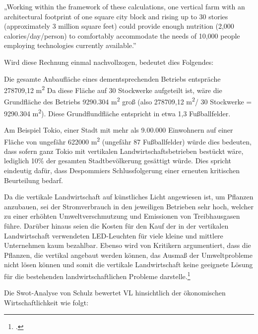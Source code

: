 \documentclass{scrartcl}
\begin{document}
\begin{displayquote}
„Working within the framework of these calculations, one vertical farm with an architectural footprint of one square city block and rising up to 30 stories (approximately 3 million square feet) could provide enough nutrition (2,000 calories/day/person) to comfortably accommodate the needs of 10,000 people employing technologies currently available.” 
\end{displayquote}

Wird diese Rechnung einmal
nachvollzogen, bedeutet dies Folgendes:

Die gesamte Anbaufläche eines dementsprechenden Betriebs entspräche\\278709,12 m\textsuperscript{2}
Da diese Fläche auf 30 Stockwerke aufgeteilt ist, wäre die Grundfläche des Betriebs 9290.304 m\textsuperscript{2} groß (also
278709,12 m\textsuperscript{2}/ 30 Stockwerke = 9290.304 m\textsuperscript{2}). Diese Grundflundfläche entspricht in etwa 1,3 Fußballfelder.

Am Beispiel Tokio, einer Stadt mit mehr als 9.00.000 Einwohnern auf einer Fläche von ungefähr 622000 m\textsuperscript{2} (ungefähr 87 Fußballfelder) würde dies bedeuten, dass sofern ganz Tokio mit vertikalen Landwirtschaftsbetrieben bestückt wäre, lediglich 10\% der gesamten Stadtbevölkerung gesättigt würde.
Dies spricht eindeutig dafür, dass Despommiers Schlussfolgerung einer erneuten kritischen Beurteilung bedarf.
 
Da die vertikale Landwirtschaft auf künstliches Licht angewiesen ist, um Pflanzen anzubauen, sei der Stromverbrauch in den jeweiligen Betrieben sehr hoch, welcher zu einer erhöhten Umweltverschmutzung und Emissionen von Treibhausgasen führe.
Darüber hinaus seien die Kosten für den Kauf der in der vertikalen Landwirtschaft verwendeten LED-Leuchten für viele kleine und mittlere Unternehmen kaum bezahlbar.
Ebenso wird von Kritikern argumentiert, dass die Pflanzen, die vertikal angebaut werden können, das Ausmaß der Umweltprobleme nicht lösen können und somit die vertikale Landwirtschaft keine geeignete Lösung für die bestehenden landwirtschaftlichen Probleme darstelle.\footcites[Vgl.][S.1]{Coyle2017WillReach}

Die Swot-Analyse von Schulz bewertet VL hinsichtlich der ökonomischen Wirtschaftlichkeit wie folgt:
 
\end{document}
